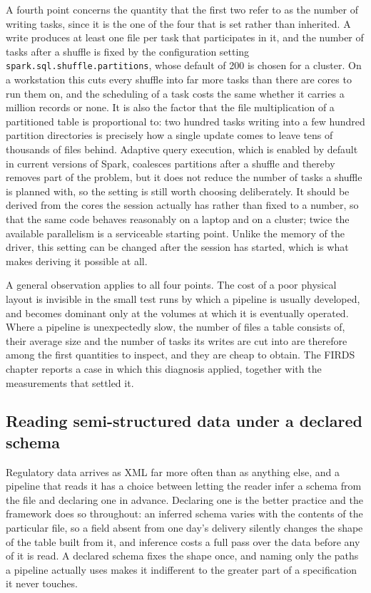\documentclass[a4paper, 11pt]{report}
\begin{document}
A fourth point concerns the quantity that the first two refer to as the number of writing tasks, since it is the one of the four that is set rather than inherited. A write produces at least one file per task that participates in it, and the number of tasks after a shuffle is fixed by the configuration setting \verb|spark.sql.shuffle.partitions|, whose default of 200 is chosen for a cluster. On a workstation this cuts every shuffle into far more tasks than there are cores to run them on, and the scheduling of a task costs the same whether it carries a million records or none. It is also the factor that the file multiplication of a partitioned table is proportional to: two hundred tasks writing into a few hundred partition directories is precisely how a single update comes to leave tens of thousands of files behind. Adaptive query execution, which is enabled by default in current versions of Spark, coalesces partitions after a shuffle and thereby removes part of the problem, but it does not reduce the number of tasks a shuffle is planned with, so the setting is still worth choosing deliberately. It should be derived from the cores the session actually has rather than fixed to a number, so that the same code behaves reasonably on a laptop and on a cluster; twice the available parallelism is a serviceable starting point. Unlike the memory of the driver, this setting can be changed after the session has started, which is what makes deriving it possible at all.

A general observation applies to all four points. The cost of a poor physical layout is invisible in the small test runs by which a pipeline is usually developed, and becomes dominant only at the volumes at which it is eventually operated. Where a pipeline is unexpectedly slow, the number of files a table consists of, their average size and the number of tasks its writes are cut into are therefore among the first quantities to inspect, and they are cheap to obtain. The FIRDS chapter reports a case in which this diagnosis applied, together with the measurements that settled it.


\subsection{Reading semi-structured data under a declared schema\label{sec:intro-data-schema}}

Regulatory data arrives as XML far more often than as anything else, and a pipeline that reads it has a choice between letting the reader infer a schema from the file and declaring one in advance. Declaring one is the better practice and the framework does so throughout: an inferred schema varies with the contents of the particular file, so a field absent from one day's delivery silently changes the shape of the table built from it, and inference costs a full pass over the data before any of it is read. A declared schema fixes the shape once, and naming only the paths a pipeline actually uses makes it indifferent to the greater part of a specification it never touches.
\end{document}
